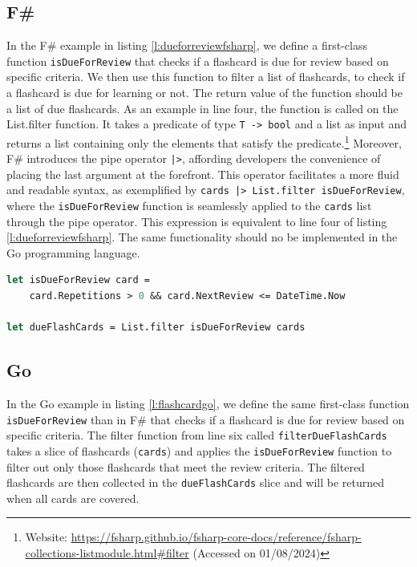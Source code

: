     \subsection*{F\#}
    In the F\# example in listing \ref{l:dueforreviewfsharp}, we define a first-class function \texttt{isDueForReview} that checks if a flashcard is due for review based on specific criteria. We then use this function to filter a list of flashcards, to check if a flashcard is due for learning or not. The return value of the function should be a list of due flashcards. As an example in line four, the function is called on the List.filter function. It takes a predicate of type \texttt{T -> bool} and a list as input and returns a list containing only the elements that satisfy the predicate.\footnote{Website: \url{https://fsharp.github.io/fsharp-core-docs/reference/fsharp-collections-listmodule.html\#filter} (Accessed on 01/08/2024)} Moreover, F\# introduces the pipe operator \texttt{|>}, affording developers the convenience of placing the last argument at the forefront. This operator facilitates a more fluid and readable syntax, as exemplified by \texttt{cards |> List.filter isDueForReview}, where the \texttt{isDueForReview} function is seamlessly applied to the \texttt{cards} list through the pipe operator. This expression is equivalent to line four of listing \ref{l:dueforreviewfsharp}. The same functionality should no be implemented in the Go programming language.

        \begin{lstlisting}[language=fsharp, firstnumber=1,float=tp, caption={First-class function reresentation in F\#}, label=l:dueforreviewfsharp]
let isDueForReview card =
    card.Repetitions > 0 && card.NextReview <= DateTime.Now
        
let dueFlashCards = List.filter isDueForReview cards
        \end{lstlisting}
        
      
    \subsection*{Go}
    In the Go example in listing \ref{l:flashcardgo}, we define the same first-class function \texttt{isDueForReview} than in F\# that checks if a flashcard is due for review based on specific criteria. The filter function from line six called \texttt{filterDueFlashCards} takes a slice of flashcards (\texttt{cards}) and applies the \texttt{isDueForReview} function to filter out only those flashcards that meet the review criteria. The filtered flashcards are then collected in the \texttt{dueFlashCards} slice and will be returned when all cards are covered.
    
